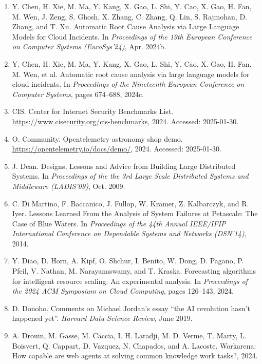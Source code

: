 \begin{enumerate}[leftmargin=2em,itemsep=2pt]
\item Y. Chen, H. Xie, M. Ma, Y. Kang, X. Gao, L. Shi, Y. Cao, X. Gao, H. Fan, M. Wen, J. Zeng, S. Ghosh, X. Zhang, C. Zhang, Q. Lin, S. Rajmohan, D. Zhang, and T. Xu. Automatic Root Cause Analysis via Large Language Models for Cloud Incidents. In \textit{Proceedings of the 19th European Conference on Computer Systems (EuroSys'24)}, Apr. 2024b.

\item Y. Chen, H. Xie, M. Ma, Y. Kang, X. Gao, L. Shi, Y. Cao, X. Gao, H. Fan, M. Wen, et al. Automatic root cause analysis via large language models for cloud incidents. In \textit{Proceedings of the Nineteenth European Conference on Computer Systems}, pages 674--688, 2024c.

\item CIS. Center for Internet Security Benchmarks List. \url{https://www.cisecurity.org/cis-benchmarks}, 2024. Accessed: 2025-01-30.

\item O. Community. Opentelemetry astronomy shop demo. \url{https://opentelemetry.io/docs/demo/}, 2024. Accessed: 2025-01-30.

\item J. Dean. Designs, Lessons and Advice from Building Large Distributed Systems. In \textit{Proceedings of the the 3rd Large Scale Distributed Systems and Middleware (LADIS'09)}, Oct. 2009.

\item C. Di Martino, F. Baccanico, J. Fullop, W. Kramer, Z. Kalbarczyk, and R. Iyer. Lessons Learned From the Analysis of System Failures at Petascale: The Case of Blue Waters. In \textit{Proceedings of the 44th Annual IEEE/IFIP International Conference on Dependable Systems and Networks (DSN'14)}, 2014.

\item Y. Diao, D. Horn, A. Kipf, O. Shchur, I. Benito, W. Dong, D. Pagano, P. Pfeil, V. Nathan, M. Narayanaswamy, and T. Kraska. Forecasting algorithms for intelligent resource scaling: An experimental analysis. In \textit{Proceedings of the 2024 ACM Symposium on Cloud Computing}, pages 126--143, 2024.

\item D. Donoho. Comments on Michael Jordan's essay ``the AI revolution hasn't happened yet''. \textit{Harvard Data Science Review}, June 2019.

\item A. Drouin, M. Gasse, M. Caccia, I. H. Laradji, M. D. Verme, T. Marty, L. Boisvert, Q. Cappart, D. Vazquez, N. Chapados, and A. Lacoste. Workarena: How capable are web agents at solving common knowledge work tasks?, 2024.


\end{enumerate}
